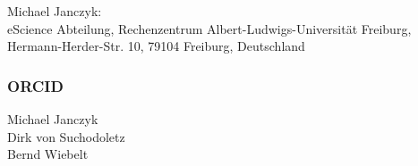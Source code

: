 \documentclass[
  paper       = a4,
  headheight  = 16pt,
  footheight  = 16pt,
  fontsize    = 10pt,
  twoside     = true,
  titlepage   = true,
]{scrartcl}
\begin{document}
Michael Janczyk:~\\
eScience Abteilung, Rechenzentrum Albert-Ludwigs-Universität Freiburg,\\
Hermann-Herder-Str. 10, 79104 Freiburg, Deutschland

\subsubsection*{ORCID} %

Michael Janczyk\,\\
Dirk von Suchodoletz\,\\
Bernd Wiebelt\,


\printbibliography
\end{document}

